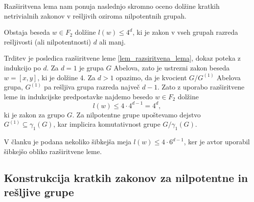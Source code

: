 \documentclass[mat1, tisk]{fmfdelo}
\numberwithin{equation}{section}  %
\begin{document}
    Razširitvena lema nam ponuja naslednjo skromno oceno dolžine kratkih netrivialnih zakonov v rešljivih oziroma nilpotentnih grupah.

    \begin{trditev}
    \label{trd_ocitna_meja_za_kratke_zakone_resljive_grupe}
     Obstaja beseda $w \in F_2$ dolžine $l(w) \le 4^{d}$, ki je zakon v vseh grupah razreda rešljivosti (ali nilpotentnosti) $d$ ali manj.  
    \end{trditev}
    \begin{dokaz}
        Trditev je posledica razširitvene leme \ref{lem_razsiritvena_lema}, dokaz poteka z indukcijo po $d$. Za $d = 1$ je grupa $G$ Abelova, zato je ustrezni zakon beseda $w = [x,y]$, ki je dolžine 4.
        Za $d > 1$ opazimo, da je kvocient $G / G^{(1)}$ Abelova grupa, $G^{(1)}$ pa rešljiva grupa razreda največ $d - 1$. Zato z uporabo razširitvene leme in indukcijske predpostavke najdemo besedo $w \in  F_2$ dolžine \begin{equation*}
            l(w) \le  4 \cdot 4^{d - 1} = 4^{d},
        \end{equation*}  
        ki je zakon za grupo $G$. Za nilpotentne grupe upoštevamo dejstvo $G^{(1)} \subseteq \gamma_1(G)$, kar implicira komutativnost grupe $G / \gamma_1(G)$. 
    \end{dokaz}
    
    \begin{opomba}
    V članku \cite[str.~8]{Kozma_Thom_2016} je podana nekoliko šibkejša meja $l(w) \le  4 \cdot 6^{d-1}$, ker je avtor uporabil šibkejšo obliko razširitvene leme.
    \end{opomba}

\subsection{Konstrukcija kratkih zakonov za nilpotentne in rešljive grupe}
\end{document}
